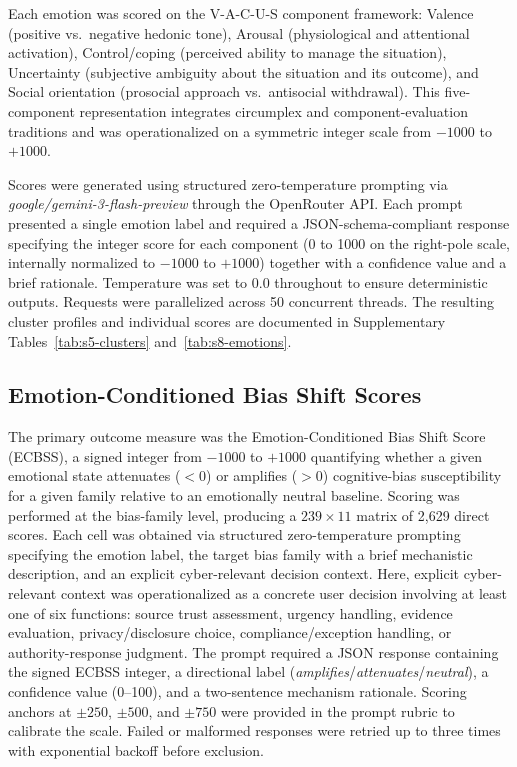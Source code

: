 \documentclass[12pt,a4paper]{article}
\newcommand{\ecbss}{\textsc{ECBSS}}
\newcommand{\vacus}{V-A-C-U-S}
\begin{document}
Each emotion was scored on the \vacus{} component framework: Valence (positive vs.\ negative hedonic tone), Arousal (physiological and attentional activation), Control/coping (perceived ability to manage the situation), Uncertainty (subjective ambiguity about the situation and its outcome), and Social orientation (prosocial approach vs.\ antisocial withdrawal). This five-component representation integrates circumplex and component-evaluation traditions \citep{russell1980circumplex, smith1985patterns, lazarus1984stress, lerner2000beyond} and was operationalized on a symmetric integer scale from $-1000$ to $+1000$.

Scores were generated using structured zero-temperature prompting via \textit{google/gemini-3-flash-preview} through the OpenRouter API. Each prompt presented a single emotion label and required a JSON-schema-compliant response specifying the integer score for each component (0 to 1000 on the right-pole scale, internally normalized to $-1000$ to $+1000$) together with a confidence value and a brief rationale. Temperature was set to 0.0 throughout to ensure deterministic outputs. Requests were parallelized across 50 concurrent threads. The resulting cluster profiles and individual scores are documented in Supplementary Tables~\ref{tab:s5-clusters} and~\ref{tab:s8-emotions}.

\subsection{Emotion-Conditioned Bias Shift Scores}

The primary outcome measure was the Emotion-Conditioned Bias Shift Score (\ecbss{}), a signed integer from $-1000$ to $+1000$ quantifying whether a given emotional state attenuates ($< 0$) or amplifies ($> 0$) cognitive-bias susceptibility for a given family relative to an emotionally neutral baseline. Scoring was performed at the bias-family level, producing a $239 \times 11$ matrix of 2,629 direct scores. Each cell was obtained via structured zero-temperature prompting specifying the emotion label, the target bias family with a brief mechanistic description, and an explicit cyber-relevant decision context. Here, explicit cyber-relevant context was operationalized as a concrete user decision involving at least one of six functions: source trust assessment, urgency handling, evidence evaluation, privacy/disclosure choice, compliance/exception handling, or authority-response judgment. The prompt required a JSON response containing the signed \ecbss{} integer, a directional label (\textit{amplifies}/\textit{attenuates}/\textit{neutral}), a confidence value (0--100), and a two-sentence mechanism rationale. Scoring anchors at $\pm 250$, $\pm 500$, and $\pm 750$ were provided in the prompt rubric to calibrate the scale. Failed or malformed responses were retried up to three times with exponential backoff before exclusion.
\end{document}
